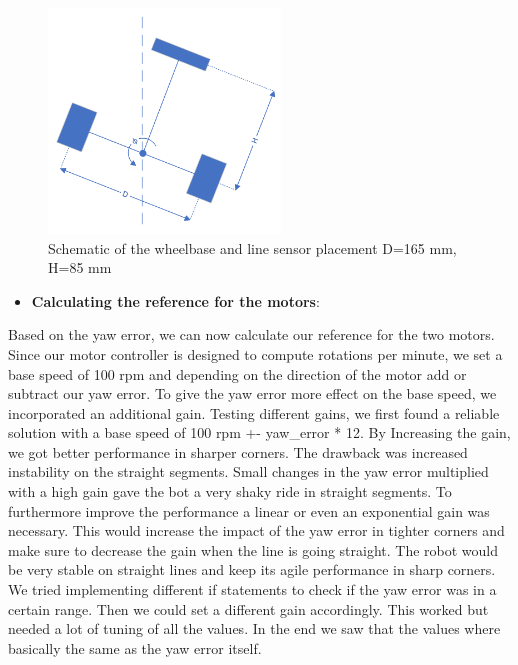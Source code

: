 \documentclass[english]{article}
\begin{document}
 \begin{figure}[!h]
    \centering
    \includegraphics[width=0.55\textwidth, height=0.35\textheight]{figures/tut.png}
    \caption{Schematic of the wheelbase and line sensor placement\newline 
    D=165 mm, H=85 mm}
    \label{fig:turt}
\end{figure}
\begin{itemize}
    \item \textbf{Calculating the reference for the motors}: 
\end{itemize}
Based on the yaw error, we can now calculate our reference for the two motors.
Since our motor controller is designed to compute rotations per minute, we set 
a base speed of 100 rpm and depending on the direction of the motor add or subtract
our yaw error. To give the yaw error more effect on the base speed, we incorporated
an additional gain. Testing different gains, we first found a reliable solution with
a base speed of 100 rpm +- yaw\_error * 12. By Increasing the gain, we got better 
performance in sharper corners. The drawback was increased instability
 on the straight segments. Small changes in the yaw error multiplied with 
 a high gain gave the bot a very shaky ride in straight segments. To furthermore 
 improve the performance a linear or even an exponential gain was necessary. 
 This would increase the impact of the yaw error in tighter corners and make 
 sure to decrease the gain when the line is going straight. The robot would 
 be very stable on straight lines and keep its agile performance in sharp corners. 
 We tried implementing different if statements to check if the yaw error was in
  a certain range. Then we could set a different gain accordingly. This worked 
  but needed a lot of tuning of all the values. In the end we saw that the values
   where basically the same as the yaw error itself.  
\end{document}

